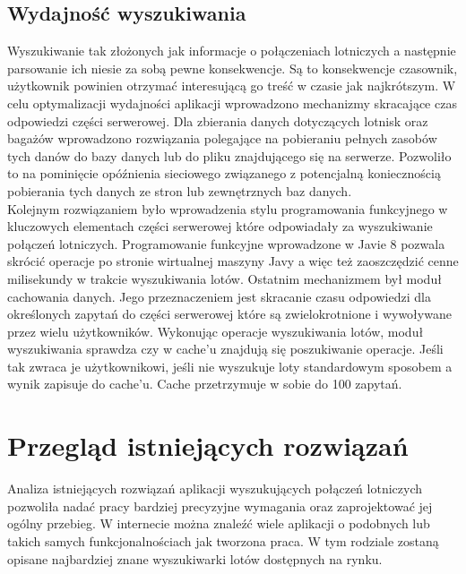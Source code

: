\documentclass[12pt, twoside]{report}
\begin{document}
\section{Wydajność wyszukiwania}
Wyszukiwanie tak złożonych jak informacje o połączeniach lotniczych a następnie parsowanie ich niesie za sobą pewne konsekwencje. Są to konsekwencje czasownik, użytkownik powinien otrzymać interesującą go treść w czasie jak najkrótszym. W celu optymalizacji wydajności aplikacji wprowadzono mechanizmy skracające czas odpowiedzi części serwerowej. Dla zbierania danych dotyczących lotnisk oraz bagażów wprowadzono rozwiązania polegające na pobieraniu pełnych zasobów tych danów do bazy danych lub do pliku znajdującego się na serwerze. Pozwoliło to na pominięcie opóźnienia sieciowego związanego z potencjalną koniecznością pobierania tych danych ze stron lub zewnętrznych baz danych. \\
Kolejnym rozwiązaniem było wprowadzenia stylu programowania funkcyjnego w kluczowych elementach części serwerowej które odpowiadały za wyszukiwanie połączeń lotniczych. Programowanie funkcyjne wprowadzone w Javie 8 pozwala skrócić operacje po stronie wirtualnej maszyny Javy a więc też zaoszczędzić cenne milisekundy w trakcie wyszukiwania lotów.
Ostatnim mechanizmem był moduł cachowania danych. Jego przeznaczeniem jest skracanie czasu odpowiedzi dla określonych zapytań do części serwerowej które są zwielokrotnione i wywoływane przez wielu użytkowników. Wykonując operacje wyszukiwania lotów, moduł wyszukiwania sprawdza czy w cache'u znajdują się poszukiwanie operacje. Jeśli tak zwraca je użytkownikowi, jeśli nie wyszukuje loty standardowym sposobem a wynik zapisuje do cache'u. Cache przetrzymuje w sobie do 100 zapytań.
\newpage
\chapter{Przegląd istniejących rozwiązań}
Analiza istniejących rozwiązań aplikacji wyszukujących połączeń lotniczych pozwoliła nadać pracy bardziej precyzyjne wymagania oraz zaprojektować jej ogólny przebieg. W internecie można znaleźć wiele aplikacji o podobnych lub takich samych funkcjonalnościach jak tworzona praca. W tym rodziale zostaną opisane najbardziej znane wyszukiwarki lotów dostępnych na rynku. 
\end{document}
